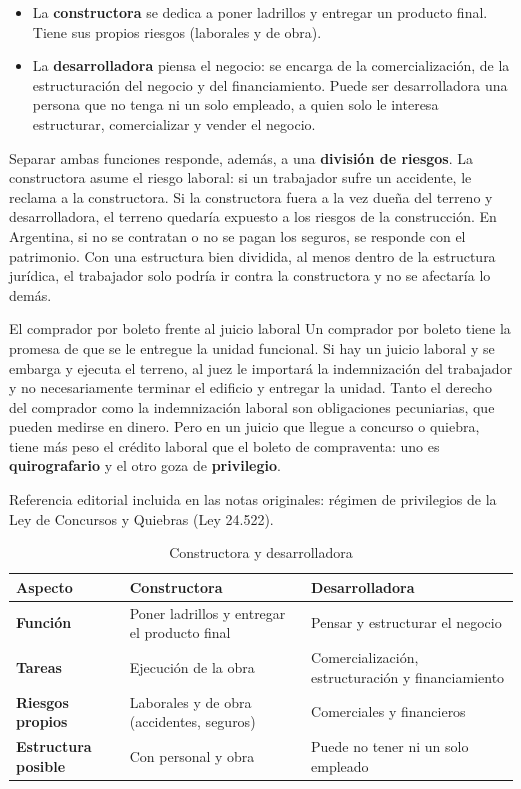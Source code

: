 \documentclass[12pt,oneside]{book}
\begin{document}
\begin{itemize}
    \item La \textbf{constructora} se dedica a poner ladrillos y entregar un producto final. Tiene sus propios riesgos (laborales y de obra).
    \item La \textbf{desarrolladora} piensa el negocio: se encarga de la comercialización, de la estructuración del negocio y del financiamiento. Puede ser desarrolladora una persona que no tenga ni un solo empleado, a quien solo le interesa estructurar, comercializar y vender el negocio.
\end{itemize}

Separar ambas funciones responde, además, a una \textbf{división de riesgos}. La constructora asume el riesgo laboral: si un trabajador sufre un accidente, le reclama a la constructora. Si la constructora fuera a la vez dueña del terreno y desarrolladora, el terreno quedaría expuesto a los riesgos de la construcción. En Argentina, si no se contratan o no se pagan los seguros, se responde con el patrimonio. Con una estructura bien dividida, al menos dentro de la estructura jurídica, el trabajador solo podría ir contra la constructora y no se afectaría lo demás.

\begin{example}{El comprador por boleto frente al juicio laboral}
Un comprador por boleto tiene la promesa de que se le entregue la unidad funcional. Si hay un juicio laboral y se embarga y ejecuta el terreno, al juez le importará la indemnización del trabajador y no necesariamente terminar el edificio y entregar la unidad. Tanto el derecho del comprador como la indemnización laboral son obligaciones pecuniarias, que pueden medirse en dinero. Pero en un juicio que llegue a concurso o quiebra, tiene más peso el crédito laboral que el boleto de compraventa: uno es \textbf{quirografario} y el otro goza de \textbf{privilegio}.
\end{example}

\begin{note}
Referencia editorial incluida en las notas originales: régimen de privilegios de la Ley de Concursos y Quiebras (Ley 24.522).
\end{note}

\begin{table}[H]
\centering
\small
\begin{tabularx}{\textwidth}{>{\raggedright\arraybackslash}p{2.8cm}YY}
\toprule
\textbf{Aspecto} & \textbf{Constructora} & \textbf{Desarrolladora} \\
\midrule
\textbf{Función} & Poner ladrillos y entregar el producto final & Pensar y estructurar el negocio \\
\textbf{Tareas} & Ejecución de la obra & Comercialización, estructuración y financiamiento \\
\textbf{Riesgos propios} & Laborales y de obra (accidentes, seguros) & Comerciales y financieros \\
\textbf{Estructura posible} & Con personal y obra & Puede no tener ni un solo empleado \\
\bottomrule
\end{tabularx}
\caption{Constructora y desarrolladora}
\end{table}
\end{document}
